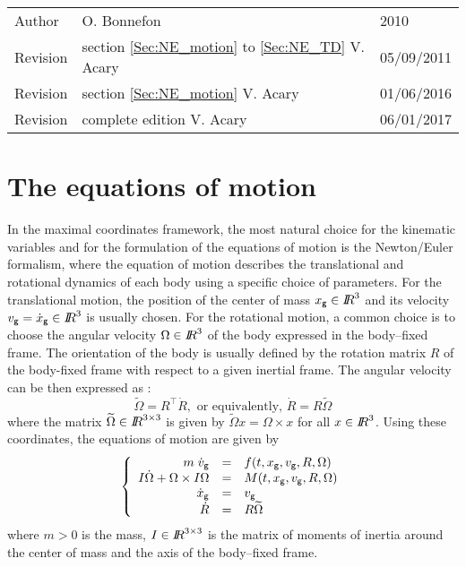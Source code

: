 


\begin{tabular}{lll}
  \centering
  Author &  O. Bonnefon &2010\\
  Revision& section \ref{Sec:NE_motion} to \ref{Sec:NE_TD} V. Acary&  05/09/2011\\
  Revision& section \ref{Sec:NE_motion}  V. Acary&  01/06/2016\\
  Revision& complete edition V. Acary&  06/01/2017\\

\end{tabular}


\section{The equations of motion}


\def\cg{\sf \small g}
In the maximal coordinates framework, the most natural choice for the kinematic  variables and for the formulation of the equations of motion is the Newton/Euler formalism, where the equation of motion describes the translational and rotational dynamics of each body using a specific choice of parameters. For the translational motion, the position of the center of mass $x_{\cg}\in \RR^3$ and its velocity  $v_{\cg} = \dot x_{\cg} \in \RR^3$ is usually chosen. For the rotational motion, a common choice is to choose the angular velocity  $\Omega \in \mbox{\rm $I\!\!R$}^3$ of the body expressed in the body--fixed frame. The orientation of the body is usually defined by the rotation matrix $R$ of the body-fixed frame with respect to a given inertial frame. The angular velocity can be then  expressed as :
\begin{equation}
  \label{eq:angularvelocity}
  \widetilde \Omega = R^\top \dot R, \text { or equivalently, } \dot R  = R \widetilde \Omega
\end{equation}
where the matrix $\widetilde \Omega \in \mbox{\rm $I\!\!R$}^{3 \times 3}$ is given by $\widetilde \Omega x = \Omega \times x$ for all $x\in \mbox{\rm $I\!\!R$}^3$. Using these coordinates, the equations of motion are given by 
\begin{equation}
  \label{eq:motion-NewtonEuler}
  \left\{\begin{array}{rcl}
      m \;\dot v_{\cg}  & = &f(t,x_{\cg}, v_{\cg},  R,  \Omega) \\
      I \dot \Omega + \Omega \times I \Omega &= & M(t,x_{\cg}, v_{\cg}, R, \Omega) \\
      \dot x_{\cg}&=& v_{\cg}\\
      \dot R  &=& R \widetilde \Omega
    \end{array}
  \right.
\end{equation}
where $m> 0$ is the mass, $I\in \mbox{\rm $I\!\!R$}^{3\times 3}$ is the matrix of moments of inertia around the center of mass and the axis of the body--fixed frame.


